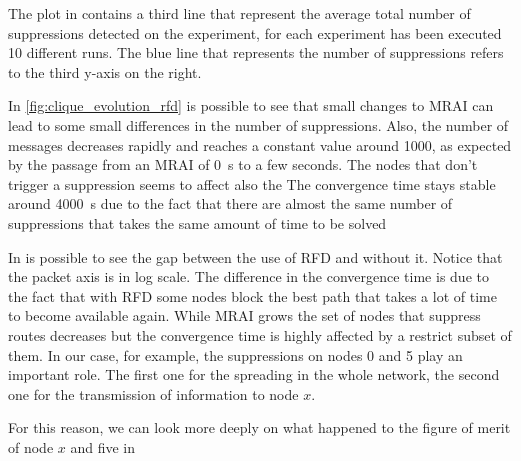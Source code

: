 The plot in  contains a third line that represent 
the average total number of suppressions detected on the experiment, for each experiment
has been executed \num{10} different runs.
The blue line that represents the number of suppressions refers to the third y-axis
on the right.

In \cref{fig:clique_evolution_rfd} is possible to see that small changes to \ac{MRAI}
can lead to some small differences in the number of suppressions.
Also, the number of messages decreases rapidly and reaches a constant 
value around \num{1000}, as expected by the passage from an \ac{MRAI} of \SI{0}{\second}
to a few seconds.
The nodes that don't trigger a suppression seems to affect also the
The convergence time stays stable around \SI{4000}{\second} due to the
fact that there are almost the same number of suppressions that takes the same
amount of time to be solved

In  is possible to see the
gap between the use of \ac{RFD} and without it.
Notice that the packet axis is in log scale.
The difference in the convergence time is due to the fact that with \ac{RFD} some
nodes block the best path that takes a lot of time to become available again.
While \ac{MRAI} grows the set of nodes that suppress routes decreases but the
convergence time is highly affected by a restrict subset of them.
In our case, for example, the suppressions on nodes \num{0} and \num{5} play
an important role.
The first one for the spreading in the whole network, the second one for the
transmission of information to node $x$.

For this reason, we can look more deeply on what happened to the figure of merit
of node $x$ and five in 

